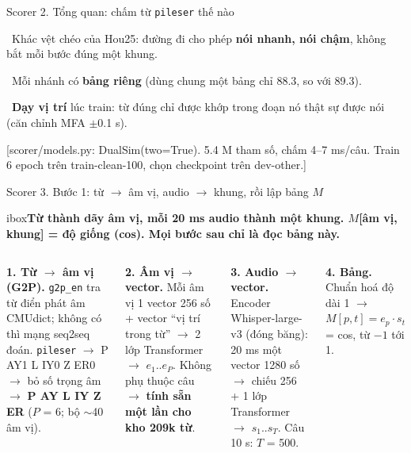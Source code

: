 \documentclass[aspectratio=169,xcolor=table]{beamer}
\newcommand{\src}[1]{\par\vfill{\tiny\color{TextGray}[#1]}}
\newcommand{\ra}{$\rightarrow$}
\newcommand{\nb}[1]{\textcolor{Accent}{#1}}
\newcommand{\insight}[1]{\begin{beamercolorbox}[sep=0.55em,rounded=true]{ibox}\small\bfseries #1\end{beamercolorbox}\vspace{0.15cm}}
\begin{document}
\begin{frame}{Scorer 2. Tổng quan: chấm từ \texttt{pileser} thế nào}
\raggedright
{\scriptsize\textbullet\ Khác vệt chéo của Hou25: đường đi cho phép \textbf{nói nhanh, nói chậm}, không bắt mỗi bước đúng một khung.\par
\textbullet\ Mỗi nhánh có \textbf{bảng riêng} (dùng chung một bảng chỉ 88.3, so với 89.3).\par
\textbullet\ \textbf{Dạy vị trí} lúc train: từ đúng chỉ được khớp trong đoạn nó thật sự được nói (căn chỉnh MFA $\pm$0.1 s).\par}
\src{scorer/models.py: DualSim(two=True). 5.4 M tham số, chấm 4--7 ms/câu. Train 6 epoch trên train-clean-100, chọn checkpoint trên dev-other.}
\end{frame}

\begin{frame}{Scorer 3. Bước 1: từ \ra{} âm vị, audio \ra{} khung, rồi lập bảng $M$}
\insight{Từ thành \nb{dãy âm vị}, mỗi 20 ms audio thành \nb{một khung}. $M$[âm vị, khung] = \nb{độ giống} (cos). Mọi bước sau chỉ là \nb{đọc bảng này}.}
\begin{columns}[T]
\scriptsize
\textcolor{Primary}{\textbf{1. Từ \ra{} âm vị (G2P).}} \texttt{g2p\_en} tra từ điển phát âm CMUdict; không có thì mạng seq2seq đoán. \texttt{pileser} \ra{} P AY1 L IY0 Z ER0 \ra{} bỏ số trọng âm \ra{} \textbf{P AY L IY Z ER} ($P$ = 6; bộ $\sim$40 âm vị).\par\vspace{0.05cm}
\textcolor{Primary}{\textbf{2. Âm vị \ra{} vector.}} Mỗi âm vị 1 vector 256 số + vector ``vị trí trong từ'' \ra{} 2 lớp Transformer \ra{} $e_1..e_P$. Không phụ thuộc câu \ra{} \textbf{tính sẵn một lần cho kho 209k từ}.\par\vspace{0.05cm}
\textcolor{Primary}{\textbf{3. Audio \ra{} vector.}} Encoder Whisper-large-v3 (đóng băng): 20 ms một vector 1280 số \ra{} chiếu 256 + 1 lớp Transformer \ra{} $s_1..s_T$. Câu 10 s: $T$ = 500.\par\vspace{0.05cm}
\textcolor{Primary}{\textbf{4. Bảng.}} Chuẩn hoá độ dài 1 \ra{} $M[p,t] = e_p \cdot s_t$ = cos, từ $-1$ tới 1.\par
{}
\centering
{}
\end{columns}
\end{frame}
\end{document}
